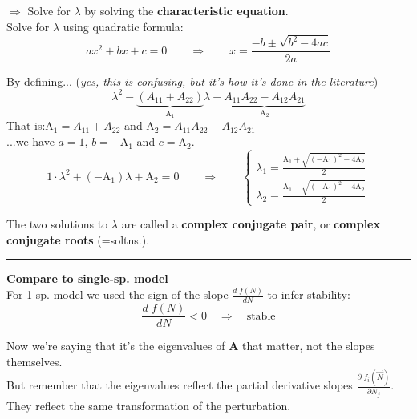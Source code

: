 \documentclass{article}
\newcommand{\ind}{\-\hspace{1cm}}
\begin{document}
\ind $\Rightarrow$ Solve for $\lambda$ by solving the \textbf{characteristic equation}.\\

Solve for $\lambda$ using quadratic formula:
\begin{equation*}
	a x^2 + bx + c = 0 \qquad  \Rightarrow  \qquad x = \frac{-b\pm \sqrt{b^2 - 4ac}}{2a}
\end{equation*}

By defining... \ind (\emph{yes, this is confusing, but it's how it's done in the literature})\\
\begin{equation*}
	\lambda^2 - \underbrace{(A_{11}+A_{22})}_{\text{A}_1}\lambda + \underbrace{A_{11}A_{22} - A_{12} A_{21}}_{\text{A}_2}
\end{equation*}
That is:\ind $\text{A}_1 = A_{11}+A_{22}$ and $\text{A}_2 = A_{11} A_{22} - A_{12} A_{21}$\\

...we have $a=1$, $b=-\text{A}_1$ and $c=\text{A}_2$.
\begin{equation*}
	1 \cdot \lambda^2 + (-\text{A}_1)\lambda + \text{A}_2 = 0 \qquad  \Rightarrow  \qquad  
	 \begin{cases} 
	\lambda_1 = \frac{\text{A}_1 + \sqrt{(-\text{A}_1)^2 - 4\text{A}_2}}{2} \\
	\lambda_2 = \frac{\text{A}_1 - \sqrt{(-\text{A}_1)^2 - 4\text{A}_2}}{2}
	\end{cases}
\end{equation*}

The two solutions to $\lambda$ are called a \textbf{complex conjugate pair}, or  \textbf{complex conjugate roots} (=soltns.).

\rule[0.5ex]{\linewidth}{1pt}
 
\textbf{Compare to single-sp. model}\\
For 1-sp. model we used the sign of the slope $\frac{d \; f(N)}{dN}$ to infer stability:
\begin{equation*}
	\frac{d \; f(N)}{dN} < 0 \quad \Rightarrow \quad \text{stable}
\end{equation*}

Now we're saying that it's the eigenvalues of $\mathbf{A}$ that matter, not the slopes themselves.\\
But remember that the eigenvalues reflect the partial derivative slopes $\frac{\partial \; f_i(\vec{N})}{\partial N_j}$. \\
\ind They reflect the same transformation of the perturbation.\\
\end{document}

